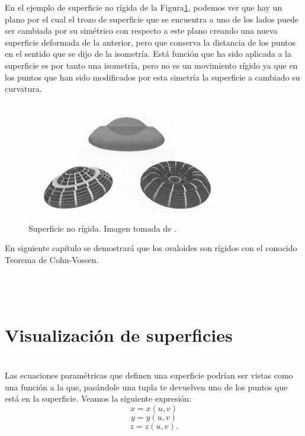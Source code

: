 En el ejemplo de superficie no rígida de la Figura\ref{fig:etiq_2}, podemos ver que hay un plano por el cual el trozo de superficie que se encuentra a uno de los lados puede ser cambiada por su simétrico con respecto a este plano creando una nueva superficie deformada de la anterior, pero que conserva la distancia de los puntos en el sentido que se dijo de la isometría. Está función que ha sido aplicada a la superficie es por tanto una isometría, pero no es un movimiento rígido ya que en los puntos que han sido modificados por esta simetría la superficie a cambiado su curvatura.
${ }$\\


\begin{figure}[h]
	\begin{center}
		\includegraphics[width=0.8\textwidth]{imagenes/no_rigid}
	\end{center}
	\caption{Superficie no rígida. Imagen tomada de \cite{MonRos}.}
	\label{fig:etiq_2}
\end{figure}

En siguiente capítulo se demostrará que los ovaloides son rígidos con el conocido Teorema de Cohn-Vossen.
${ }$\\


${ }$\\
${ }$\\
${ }$\\
\section{Visualización de superficies}
${ }$\\

Las ecuaciones paramétricas que definen una superficie podrían ser vistas como una función a la que, pasándole una tupla te devuelven uno de los puntos que está en la superficie. Veamos la siguiente expresión:
${ }$\\
$$ x = x(u,v) $$
$$ y = y(u,v) $$
$$ z = z(u,v). $$
${ }$\\

